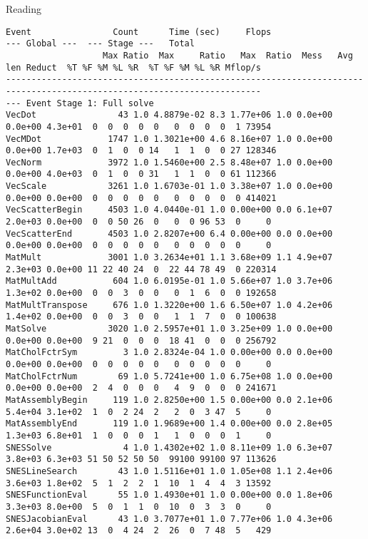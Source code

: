 \begin{frame}[fragile]{Reading }
\begin{Verbatim}[formatcom=\tiny]
Event                Count      Time (sec)     Flops                             --- Global ---  --- Stage ---   Total
                   Max Ratio  Max     Ratio   Max  Ratio  Mess   Avg len Reduct  %T %F %M %L %R  %T %F %M %L %R Mflop/s
------------------------------------------------------------------------------------------------------------------------
--- Event Stage 1: Full solve
VecDot                43 1.0 4.8879e-02 8.3 1.77e+06 1.0 0.0e+00 0.0e+00 4.3e+01  0  0  0  0  0   0  0  0  0  1 73954
VecMDot             1747 1.0 1.3021e+00 4.6 8.16e+07 1.0 0.0e+00 0.0e+00 1.7e+03  0  1  0  0 14   1  1  0  0 27 128346
VecNorm             3972 1.0 1.5460e+00 2.5 8.48e+07 1.0 0.0e+00 0.0e+00 4.0e+03  0  1  0  0 31   1  1  0  0 61 112366
VecScale            3261 1.0 1.6703e-01 1.0 3.38e+07 1.0 0.0e+00 0.0e+00 0.0e+00  0  0  0  0  0   0  0  0  0  0 414021
VecScatterBegin     4503 1.0 4.0440e-01 1.0 0.00e+00 0.0 6.1e+07 2.0e+03 0.0e+00  0  0 50 26  0   0  0 96 53  0     0
VecScatterEnd       4503 1.0 2.8207e+00 6.4 0.00e+00 0.0 0.0e+00 0.0e+00 0.0e+00  0  0  0  0  0   0  0  0  0  0     0
MatMult             3001 1.0 3.2634e+01 1.1 3.68e+09 1.1 4.9e+07 2.3e+03 0.0e+00 11 22 40 24  0  22 44 78 49  0 220314
MatMultAdd           604 1.0 6.0195e-01 1.0 5.66e+07 1.0 3.7e+06 1.3e+02 0.0e+00  0  0  3  0  0   0  1  6  0  0 192658
MatMultTranspose     676 1.0 1.3220e+00 1.6 6.50e+07 1.0 4.2e+06 1.4e+02 0.0e+00  0  0  3  0  0   1  1  7  0  0 100638
MatSolve            3020 1.0 2.5957e+01 1.0 3.25e+09 1.0 0.0e+00 0.0e+00 0.0e+00  9 21  0  0  0  18 41  0  0  0 256792
MatCholFctrSym         3 1.0 2.8324e-04 1.0 0.00e+00 0.0 0.0e+00 0.0e+00 0.0e+00  0  0  0  0  0   0  0  0  0  0     0
MatCholFctrNum        69 1.0 5.7241e+00 1.0 6.75e+08 1.0 0.0e+00 0.0e+00 0.0e+00  2  4  0  0  0   4  9  0  0  0 241671
MatAssemblyBegin     119 1.0 2.8250e+00 1.5 0.00e+00 0.0 2.1e+06 5.4e+04 3.1e+02  1  0  2 24  2   2  0  3 47  5     0
MatAssemblyEnd       119 1.0 1.9689e+00 1.4 0.00e+00 0.0 2.8e+05 1.3e+03 6.8e+01  1  0  0  0  1   1  0  0  0  1     0
SNESSolve              4 1.0 1.4302e+02 1.0 8.11e+09 1.0 6.3e+07 3.8e+03 6.3e+03 51 50 52 50 50  99100 99100 97 113626
SNESLineSearch        43 1.0 1.5116e+01 1.0 1.05e+08 1.1 2.4e+06 3.6e+03 1.8e+02  5  1  2  2  1  10  1  4  4  3 13592
SNESFunctionEval      55 1.0 1.4930e+01 1.0 0.00e+00 0.0 1.8e+06 3.3e+03 8.0e+00  5  0  1  1  0  10  0  3  3  0     0
SNESJacobianEval      43 1.0 3.7077e+01 1.0 7.77e+06 1.0 4.3e+06 2.6e+04 3.0e+02 13  0  4 24  2  26  0  7 48  5   429

\end{Verbatim}
\end{frame}
